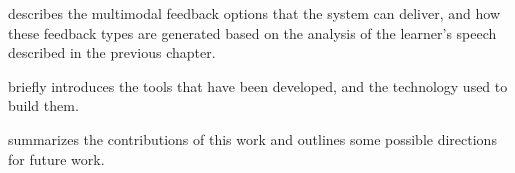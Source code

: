  describes the multimodal feedback options that the system can deliver, and how these feedback types are generated based on the analysis of the learner's speech described in the previous chapter. 

 briefly introduces the tools that have been developed, and the technology used to build them. 

 summarizes the contributions of this work and outlines some 
possible directions for future work.



%


